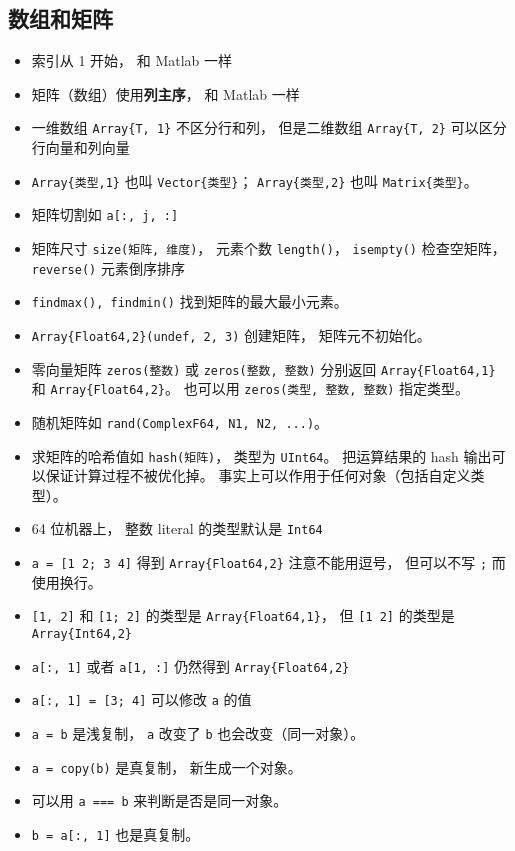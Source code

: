 \subsection{数组和矩阵}
\begin{itemize}
\item 索引从 1 开始， 和 Matlab 一样
\item 矩阵（数组）使用\textbf{列主序}， 和 Matlab 一样
\item 一维数组 \verb|Array{T, 1}| 不区分行和列， 但是二维数组 \verb|Array{T, 2}| 可以区分行向量和列向量
\item \verb|Array{类型,1}| 也叫 \verb|Vector{类型}|； \verb|Array{类型,2}| 也叫 \verb|Matrix{类型}|。
\item 矩阵切割如 \verb|a[:, j, :]|
\item 矩阵尺寸 \verb|size(矩阵, 维度)|， 元素个数 \verb|length()|， \verb|isempty()| 检查空矩阵， \verb|reverse()| 元素倒序排序
\item \verb|findmax(), findmin()| 找到矩阵的最大最小元素。
\item \verb|Array{Float64,2}(undef, 2, 3)| 创建矩阵， 矩阵元不初始化。
\item 零向量矩阵 \verb|zeros(整数)| 或 \verb|zeros(整数, 整数)| 分别返回 \verb|Array{Float64,1}| 和 \verb|Array{Float64,2}|。 也可以用 \verb|zeros(类型, 整数, 整数)| 指定类型。
\item 随机矩阵如 \verb|rand(ComplexF64, N1, N2, ...)|。
\item 求矩阵的哈希值如 \verb|hash(矩阵)|， 类型为 \verb|UInt64|。 把运算结果的 hash 输出可以保证计算过程不被优化掉。 事实上可以作用于任何对象（包括自定义类型）。
\item 64 位机器上， 整数 literal 的类型默认是 \verb|Int64|
\item \verb|a = [1 2; 3 4]| 得到 \verb|Array{Float64,2}| 注意不能用逗号， 但可以不写 \verb|;| 而使用换行。
\item \verb|[1, 2]| 和 \verb|[1; 2]| 的类型是 \verb|Array{Float64,1}|， 但 \verb|[1 2]| 的类型是 \verb|Array{Int64,2}|
\item \verb|a[:, 1]| 或者 \verb|a[1, :]| 仍然得到 \verb|Array{Float64,2}|
\item \verb|a[:, 1] = [3; 4]| 可以修改 \verb|a| 的值
\item \verb|a = b| 是浅复制， \verb|a| 改变了 \verb|b| 也会改变（同一对象）。
\item \verb|a = copy(b)| 是真复制， 新生成一个对象。
\item 可以用 \verb|a === b| 来判断是否是同一对象。
\item \verb|b = a[:, 1]| 也是真复制。

\end{itemize}
